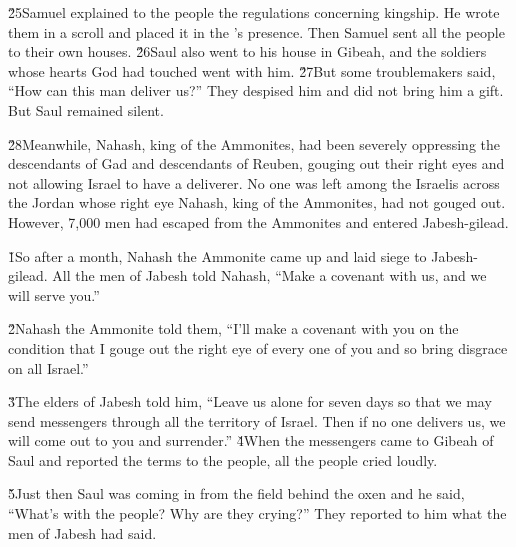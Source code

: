 \v{25}Samuel explained to the people the regulations concerning kingship. He wrote them in a scroll and placed it in the 's presence. Then Samuel sent all the people to their own houses. \v{26}Saul also went to his house in Gibeah, and the soldiers whose hearts God had touched went with him. \v{27}But some troublemakers said, ``How can this man deliver us?'' They despised him and did not bring him a gift. But Saul remained silent.

\v{28}Meanwhile, Nahash, king of the Ammonites, had been severely oppressing the descendants of Gad and descendants of Reuben, gouging out their right eyes and not allowing Israel to have a deliverer. No one was left among the Israelis across the Jordan whose right eye Nahash, king of the Ammonites, had not gouged out. However, 7,000 men had escaped from the Ammonites and entered Jabesh-gilead.

\v{1}So after a month, Nahash the Ammonite came up and laid siege to Jabesh-gilead. All the men of Jabesh told Nahash, ``Make a covenant with us, and we will serve you.''

\v{2}Nahash the Ammonite told them, ``I'll make a covenant with you on the condition that I gouge out the right eye of every one of you and so bring disgrace on all Israel.''

\v{3}The elders of Jabesh told him, ``Leave us alone for seven days so that we may send messengers through all the territory of Israel. Then if no one delivers us, we will come out to you and surrender.'' \v{4}When the messengers came to Gibeah of Saul and reported the terms to the people, all the people cried loudly.

\v{5}Just then Saul was coming in from the field behind the oxen and he said, ``What's with the people? Why are they crying?'' They reported to him what the men of Jabesh had said.

